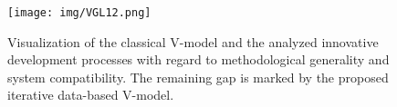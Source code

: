 \begin{figure}[h!]
	\centering	
	\texttt{[image: img/VGL12.png]}
	\caption{Visualization of the classical V-model and the analyzed innovative development processes with regard to methodological generality and system compatibility. The remaining gap is marked by the proposed iterative data-based V-model.}
	\label{fig:cmp}
\end{figure} 









